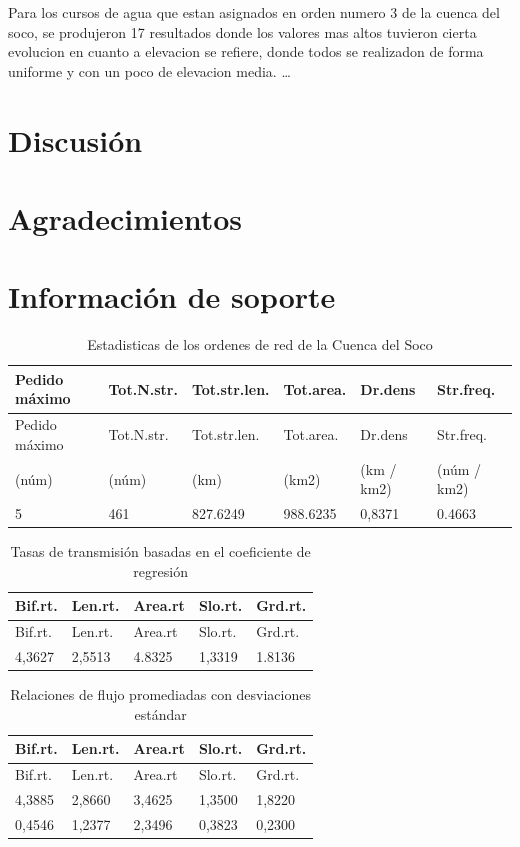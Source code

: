 \documentclass[11pt,]{article}
\begin{document}
Para los cursos de agua que estan asignados en orden numero 3 de la
cuenca del soco, se produjeron 17 resultados donde los valores mas altos
tuvieron cierta evolucion en cuanto a elevacion se refiere, donde todos
se realizadon de forma uniforme y con un poco de elevacion media. \ldots

\section{Discusión}\label{discusiuxf3n}

\section{Agradecimientos}\label{agradecimientos}

\section{Información de soporte}\label{informaciuxf3n-de-soporte}

\begin{longtable}[]{@{}llllll@{}}
\caption{\label{tablauno}Estadisticas de los ordenes de red de la Cuenca
del Soco}\tabularnewline
\toprule
Pedido máximo & Tot.N.str. & Tot.str.len. & Tot.area. & Dr.dens &
Str.freq.\tabularnewline
\midrule
\endfirsthead
\toprule
Pedido máximo & Tot.N.str. & Tot.str.len. & Tot.area. & Dr.dens &
Str.freq.\tabularnewline
\midrule
\endhead
(núm) & (núm) & (km) & (km2) & (km / km2) & (núm / km2)\tabularnewline
5 & 461 & 827.6249 & 988.6235 & 0,8371 & 0.4663\tabularnewline
\bottomrule
\end{longtable}

\begin{longtable}[]{@{}lllll@{}}
\caption{\label{tablados}Tasas de transmisión basadas en el coeficiente
de regresión}\tabularnewline
\toprule
Bif.rt. & Len.rt. & Area.rt & Slo.rt. & Grd.rt.\tabularnewline
\midrule
\endfirsthead
\toprule
Bif.rt. & Len.rt. & Area.rt & Slo.rt. & Grd.rt.\tabularnewline
\midrule
\endhead
4,3627 & 2,5513 & 4.8325 & 1,3319 & 1.8136\tabularnewline
\bottomrule
\end{longtable}

\begin{longtable}[]{@{}lllll@{}}
\caption{\label{tablatres}Relaciones de flujo promediadas con
desviaciones estándar}\tabularnewline
\toprule
Bif.rt. & Len.rt. & Area.rt & Slo.rt. & Grd.rt.\tabularnewline
\midrule
\endfirsthead
\toprule
Bif.rt. & Len.rt. & Area.rt & Slo.rt. & Grd.rt.\tabularnewline
\midrule
\endhead
4,3885 & 2,8660 & 3,4625 & 1,3500 & 1,8220\tabularnewline
0,4546 & 1,2377 & 2,3496 & 0,3823 & 0,2300\tabularnewline
\bottomrule
\end{longtable}
\end{document}
